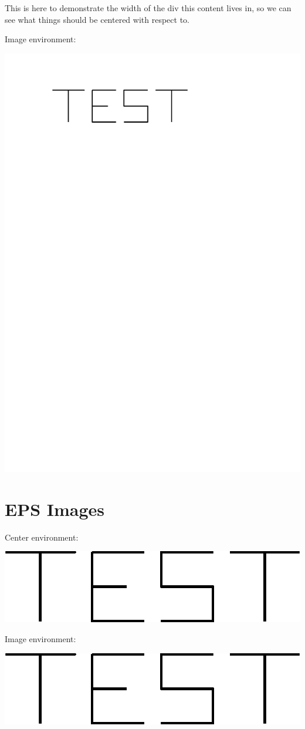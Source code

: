 \documentclass{ximera}
\begin{document}
\begin{problem}
This is here to demonstrate the width of the div this content lives in, so we can see what things should be centered with respect to.
\end{problem}

Image environment:

\begin{image}
\includegraphics{TestImagePDF}
\end{image}



\section{EPS Images}

Center environment:

\begin{center}
\includegraphics{TestImageEPS}
\end{center}

Image environment:

\begin{image}
\includegraphics{TestImageEPS}
\end{image}
\end{document}
